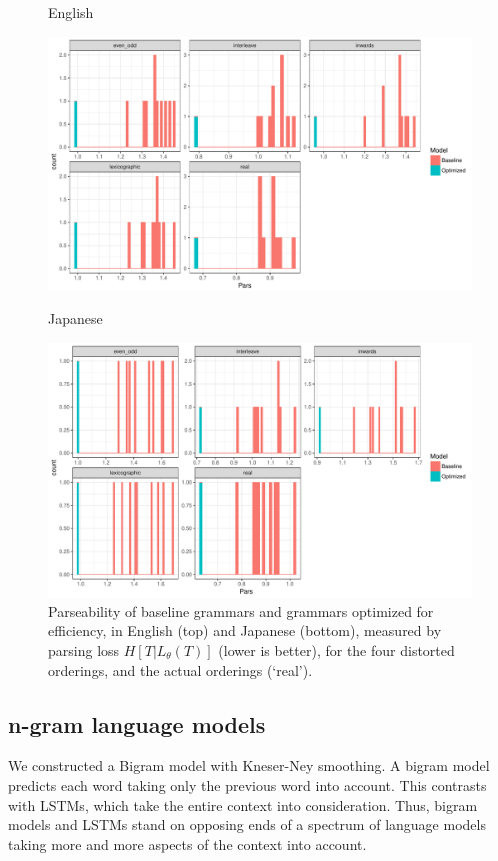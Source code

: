 \documentclass[12pt]{article}
\begin{document}
\begin{figure}
    \centering
    English
    
    \includegraphics[scale=.5]{../results/permuted/adversarial-parse-loss-english.pdf}
    
    Japanese
    
    \includegraphics[scale=.5]{../results/permuted/adversarial-parse-loss-japanese.pdf}
	\caption{Parseability of baseline grammars and grammars optimized for efficiency, in English (top) and Japanese (bottom), measured by parsing loss $H[T|L_\theta(T)]$ (lower is better), for the four distorted orderings, and the actual orderings (`real').}
    \label{fig:distorted-parser}
\end{figure}


\subsection{n-gram language models}


We constructed a Bigram model with Kneser-Ney smoothing.
A bigram model predicts each word taking only the previous word into account.
This contrasts with LSTMs, which take the entire context into consideration.
Thus, bigram models and LSTMs stand on opposing ends of a spectrum of language models taking more and more aspects of the context into account.
\end{document}

